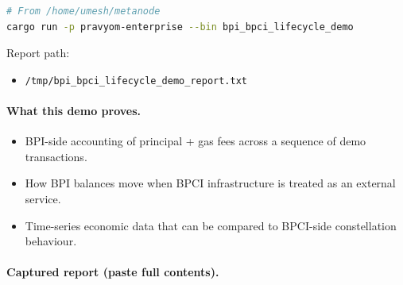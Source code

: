 \begin{lstlisting}[language=bash]
# From /home/umesh/metanode
cargo run -p pravyom-enterprise --bin bpi_bpci_lifecycle_demo
\end{lstlisting}

Report path:

\begin{itemize}
  \item \texttt{/tmp/bpi_bpci_lifecycle_demo_report.txt}
\end{itemize}

\paragraph{What this demo proves.}

\begin{itemize}
  \item BPI-side accounting of principal + gas fees across a sequence of demo transactions.
  \item How BPI balances move when BPCI infrastructure is treated as an external service.
  \item Time-series economic data that can be compared to BPCI-side constellation behaviour.
\end{itemize}

\paragraph{Captured report (paste full contents).}

